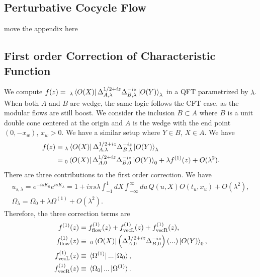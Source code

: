 \documentclass[a4paper,11pt]{article}
\theoremstyle{definition}
\begin{document}
\subsection{Perturbative Cocycle Flow}
move the appendix here
\subsection{First order Correction of Characteristic Function}
We compute $f(z)= \;_\lambda\bra{O(X)}\Delta_{A,\lambda}^{1/2+iz}\Delta_{B,\lambda}^{-iz}\ket{O(Y)}_\lambda$ in a QFT parametrized by $\lambda$. When both $A$ and $B$ are wedge, the same logic follows the CFT case, as the modular flows are still boost. We consider the inclusion $B\subset A$ where $B$ is a unit double cone centered at the origin and $A$ is the wedge with the end point $(0,-x_w)$, $x_w >0$. We have a similar setup where $Y\in B$, $X\in A$. We have
\begin{align}
    f(z) =&\;_\lambda\bra{O(X)}\Delta_{A,\lambda}^{1/2+iz}\Delta_{B,\lambda}^{-iz}\ket{O(Y)}_\lambda \\
    =&\; _0\bra{O(X)}\Delta_{A,0}^{1/2+iz}\Delta_{B,0}^{-iz}\ket{O(Y)}_0 + \lambda f^{(1)}(z) + O(\lambda^2).
\end{align}
There are three contributions to the first order correction. We have
\begin{gather}
    u_{s,\lambda} = e^{-isK_0}e^{isK_\lambda} = 1 + i\pi s\lambda \int_{-1}^1 dX \int_{-\infty}^{\infty} du \, Q(u,X)O(t_u,x_u) +O(\lambda^2),\\
    \Omega_\lambda = \Omega_0 + \lambda\Omega^{(1)} + O(\lambda^2).
\end{gather}
Therefore, the three correction terms are
\begin{align}
    f^{(1)}(z) =&\; f^{(1)}_{\text{flow}}(z) + f^{(1)}_{\text{vecL}}(z) + f^{(1)}_{\text{vecR}}(z),\\
    f^{(1)}_{\text{flow}}(z) \equiv&\; \;_0\bra{O(X)}\left(\Delta_{A,0}^{1/2+iz}\Delta_{B,0}^{-iz}\right) \left(...\right)\ket{O(Y)}_0, \\
    f^{(1)}_{\text{vecL}}(z) \equiv&\; \bra{\Omega^{(1)}} ... \ket{\Omega_0},\\
    f^{(1)}_{\text{vecR}}(z) \equiv&\; \bra{\Omega_0} ... \ket{\Omega^{(1)}}.
\end{align}
\end{document}
